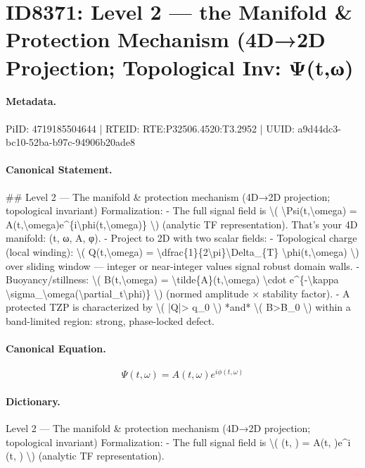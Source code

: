 \section*{ID8371: Level 2 — the Manifold \& Protection Mechanism (4D→2D Projection; Topological Inv: Ψ(t,ω)}
\paragraph{Metadata.}
PiID: 4719185504644 | RTEID: RTE:P32506.4520:T3.2952 | UUID: a9d44dc3-bc10-52ba-b97c-94906b20ade8

\paragraph{Canonical Statement.}
\#\# Level 2 — The manifold \& protection mechanism (4D→2D projection; topological invariant) Formalization: - The full signal field is \textbackslash{}( \textbackslash{}Psi(t,\textbackslash{}omega) = A(t,\textbackslash{}omega)e\textasciicircum{}\{i\textbackslash{}phi(t,\textbackslash{}omega)\} \textbackslash{}) (analytic TF representation). That’s your 4D manifold: (t, ω, A, φ). - Project to 2D with two scalar fields: - Topological charge (local winding): \textbackslash{}( Q(t,\textbackslash{}omega) = \textbackslash{}dfrac\{1\}\{2\textbackslash{}pi\}\textbackslash{}Delta\_\{T\} \textbackslash{}phi(t,\textbackslash{}omega) \textbackslash{}) over sliding window — integer or near-integer values signal robust domain walls. - Buoyancy/stillness: \textbackslash{}( B(t,\textbackslash{}omega) = \textbackslash{}tilde\{A\}(t,\textbackslash{}omega) \textbackslash{}cdot e\textasciicircum{}\{-\textbackslash{}kappa \textbackslash{}sigma\_\textbackslash{}omega(\textbackslash{}partial\_t\textbackslash{}phi)\} \textbackslash{}) (normed amplitude × stability factor). - A protected TZP is characterized by \textbackslash{}( |Q|> q\_0 \textbackslash{}) *and* \textbackslash{}( B>B\_0 \textbackslash{}) within a band-limited region: strong, phase-locked defect.

\paragraph{Canonical Equation.}
\[
\Psi(t,\omega) = A(t,\omega)e^{i\phi(t,\omega)}
\]

\paragraph{Dictionary.}
Level 2 — The manifold \& protection mechanism (4D→2D projection; topological invariant) Formalization: - The full signal field is \textbackslash{}( (t, ) = A(t, )e\textasciicircum{}i (t, ) \textbackslash{}) (analytic TF representation).

